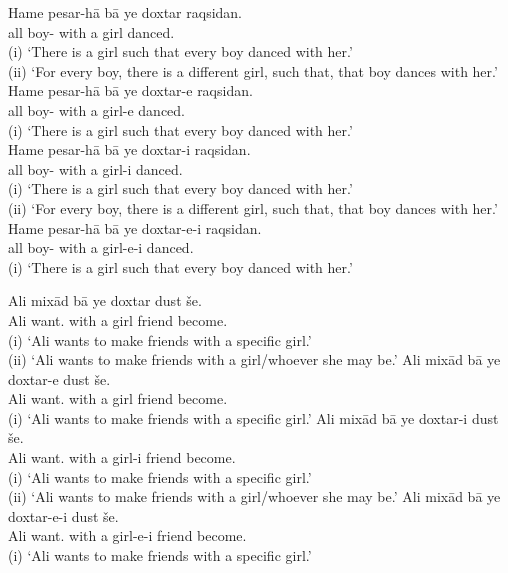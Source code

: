 \documentclass[output=paper]{langsci/langscibook}
\begin{document}
\begin{exe}
\ex\label{4ex:25}
	\begin{xlista}
	\ex\label{4ex:25a}
	\gll	Hame	pesar-hā	bā 	ye doxtar	raqsidan. \\
		all	boy-{}		with	a   girl		danced.{} \\
	\glt	(i) `There is a girl such that every boy danced with her.' \\
		(ii) `For every boy, there is a different girl, such that, that boy dances with her.'
	\ex\label{4ex:25b}
	\gll	Hame	pesar-hā	bā 	ye doxtar-e	raqsidan. \\
		all	boy-{}	with	a   	girl-e		danced.{} \\
	\glt	(i) `There is a girl such that every boy danced with her.' \\
	\ex\label{4ex:25c}
	\gll	Hame	pesar-hā	bā 	ye doxtar-i		raqsidan. \\
		all	boy-{}	with		a  girl-i		danced.{} \\
	\glt	(i) `There is a girl such that every boy danced with her.' \\
		(ii) `For every boy, there is a different girl, such that, that boy dances with her.' 
	\ex\label{4ex:25d}
	\gll	Hame	pesar-hā	bā 	ye doxtar-e-i	 raqsidan. \\
		all	boy-{}	with		a  girl-e-i	 danced.{} \\
	\glt	(i) `There is a girl such that every boy danced with her.'
	\end{xlista}
\ex\label{4ex:26}
	\begin{xlista}
	\ex\label{4ex:26a}
	\gll	Ali	mixād		bā 	ye doxtar	dust 	še. \\
		Ali	want.{}	with 	a   girl		friend	become.{\sc{3sg}} \\
	\glt	(i) `Ali wants to make friends with a specific girl.' \\
		(ii) `Ali wants to make friends with a girl/whoever she may be.'
	\ex\label{4ex:26b}
	\gll	Ali	mixād		bā 	ye doxtar-e	dust 	še. \\
		Ali	want.{}	with 	a   girl		friend	become.{\sc{3sg}} \\
	\glt	(i) `Ali wants to make friends with a specific girl.'
\filbreak
	\ex\label{4ex:26c}
	\gll	Ali	mixād		bā 	ye doxtar-i	 dust 	še. \\
		Ali	want.{}	with 	a   girl-i	friend	become.{\sc{3sg}} \\
	\glt	(i) `Ali wants to make friends with a specific girl.' \\
		(ii) `Ali wants to make friends with a girl/whoever she may be.'
	\ex\label{4ex:26d}
	\gll	Ali	mixād		bā 	ye doxtar-e-i	dust 	še. \\
		Ali	want.{}	with 	a   girl-e-i	friend	become.{\sc{3sg}} \\
	\glt	(i) `Ali wants to make friends with a specific girl.'
	\end{xlista}
\end{exe}
\end{document}
